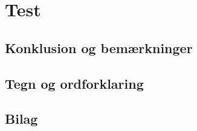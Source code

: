 \documentclass[12pt,oneside,a4paper,english]{article}
\begin{document}
\newpage
\section{Test}

\thispagestyle{fancy}

\newpage
\begin{flushleft}
\section{Konklusion og bemærkninger}

\end{flushleft}
\thispagestyle{fancy}

\newpage
\begin{flushleft}
\section{Tegn og ordforklaring}
\end{flushleft}

\thispagestyle{fancy}

\newpage
\begin{flushleft}
\section{Bilag}

\end{flushleft}
\label{endOfDoc}
\end{document}
